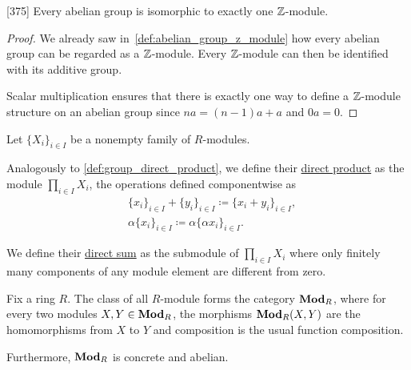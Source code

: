 \begin{theorem}\label{thm:abelian_group_iff_z_module}\cite{Knapp2016BAlg}[375]
  Every abelian group is isomorphic to exactly one $\mathbb Z$-module.
\end{theorem}
\begin{proof}
  We already saw in~\cref{def:abelian_group_z_module} how every abelian group can be regarded as a $\mathbb Z$-module. Every $\mathbb Z$-module can then be identified with its additive group.

  Scalar multiplication ensures that there is exactly one way to define a $\mathbb Z$-module structure on an abelian group since $na = (n-1)a + a$ and $0a = 0$.
\end{proof}

\begin{definition}\label{def:module_direct_product}
  Let $\{ X_i \}_{i \in I}$ be a nonempty family of $R$-modules.

  Analogously to \cref{def:group_direct_product}, we define their \uline{direct product} as the module $\prod_{i \in I} X_i$, the operations defined componentwise as
  \begin{align*}
    &\{ x_i \}_{i \in I} + \{ y_i \}_{i \in I}
    \coloneqq
    \{ x_i + y_i \}_{i \in I}, \\
    &\alpha \{ x_i \}_{i \in I}
    \coloneqq
    \alpha \{ \alpha x_i \}_{i \in I}.
  \end{align*}

  We define their \uline{direct sum} as the submodule of $\prod_{i \in I} X_i$ where only finitely many components of any module element are different from zero.
\end{definition}

\begin{definition}\label{def:category_of_modules}
  Fix a ring $R$. The class of all $R$-module forms the category $\operatorname{\mathbf{Mod}}_R$, where for every two modules $X, Y \in \operatorname{\mathbf{Mod}}_R$, the morphisms $\operatorname{\mathbf{Mod}}_R(X, Y)$ are the homomorphisms from $X$ to $Y$ and composition is the usual function composition.

  Furthermore, $\operatorname{\mathbf{Mod}}_R$ is concrete and abelian.
\end{definition}


